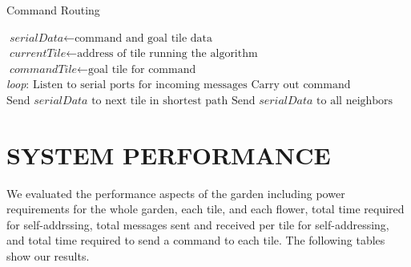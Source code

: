 \documentclass[letterpaper, 10 pt, conference]{ieeeconf}  %
\begin{document}
\begin{algorithm}
\caption{Command Routing}\label{euclid}
\begin{algorithmic}[1]
\State $\textit{serialData} \gets \text{command and goal tile data}$
\State $\textit{currentTile} \gets \text{address of tile running the algorithm}$
\State $\textit{commandTile} \gets \text{goal tile for command}$\\

\BState \emph{loop}:
\State $\text{Listen to serial ports for incoming messages}$
\State $\text{Carry out command}$
\Else 
{}
\State $\text{Send } \textit{serialData } \text{to next tile in shortest path}$
\Else
\State $\text{Send } \textit{serialData } \text{to } \text{all neighbors}$
\EndIf
\EndIf
\EndIf
\EndProcedure
\end{algorithmic}
\label{fig: alg1}
\end{algorithm}

\section{SYSTEM PERFORMANCE}
We evaluated the performance aspects of the garden including power requirements for the whole garden, each tile, and each flower, total time required for self-addrssing, total messages sent and received per tile for self-addressing, and total time required to send a command to each tile.  The following tables show our results.
\end{document}
